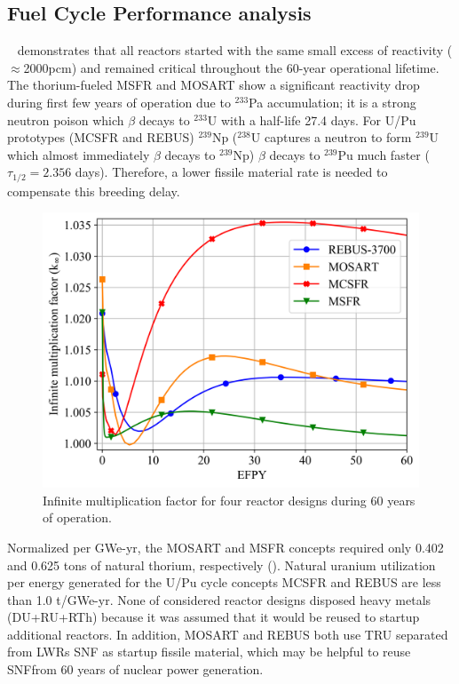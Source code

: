 \documentclass{anstrans}
\begin{document}
\subsection{Fuel Cycle Performance analysis} 
\label{sec:performance}
~ demonstrates that all reactors started with the same small excess of reactivity ($\approx$2000pcm) and remained critical throughout the 60-year operational lifetime. The thorium-fueled \gls{MSFR} and \gls{MOSART} show a significant reactivity drop during first few years of operation due to $^{233}$Pa accumulation; it is a strong neutron poison which $\beta$ decays to $^{233}$U with a half-life 27.4 days. For U/Pu prototypes (\gls{MCSFR} and REBUS) $^{239}$Np ($^{238}$U captures a neutron to form $^{239}$U which almost immediately $\beta$ decays to $^{239}$Np) $\beta$ decays to $^{239}$Pu much faster ($\tau_{1/2}=2.356$ days). Therefore, a lower fissile material rate is needed to compensate this breeding delay.
\begin{figure}[!htb]
  \centering
  \includegraphics[scale=0.585]{./Figures/k_inf.png}
  \vspace{-0.25in}
  \caption{Infinite multiplication factor for four reactor designs during 60 years of operation.}   
  \label{fig:k_inf}
\end{figure}

Normalized per GWe-yr, the \gls{MOSART} and \gls{MSFR} concepts required only 0.402 and 0.625 tons of natural thorium, respectively (). Natural uranium utilization per energy generated for the U/Pu cycle concepts \gls{MCSFR} and REBUS are less than 1.0 t/GWe-yr. None of considered reactor designs disposed heavy metals (\gls{DU}+\gls{RU}+\gls{RTh}) because it was assumed that it would be reused to startup additional reactors. 
In addition, \gls{MOSART} and REBUS both use \gls{TRU} separated from \glspl{LWR} \gls{SNF} as startup fissile material, which may be helpful to reuse \gls{SNF}from 60 years of nuclear power generation. 
\end{document}
